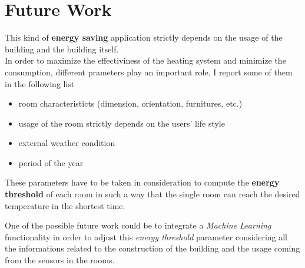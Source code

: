 \section{Future Work}
This kind of \textbf{energy saving} application strictly depends on the usage of the building and the building itself.\\
In order to maximize the effectiviness of the heating system and minimize the consumption, different prameters play an important role, I report some of them in the following list
\begin{itemize}
	\item room characteristicts (dimension, orientation, furnitures, etc.)
	\item usage of the room strictly depends on the users' life style
	\item external weather condition
	\item period of the year
\end{itemize}
These parameters have to be taken in consideration to compute the \textbf{energy threshold} of each room in such a way that the single room can reach the desired temperature in the shortest time.

One of the possible future work could be to integrate a \textit{Machine Learning} functionality in order to adjust this \textit{energy threshold} parameter considering all the informations related to the construction of the building and the usage coming from the sensors in the rooms.